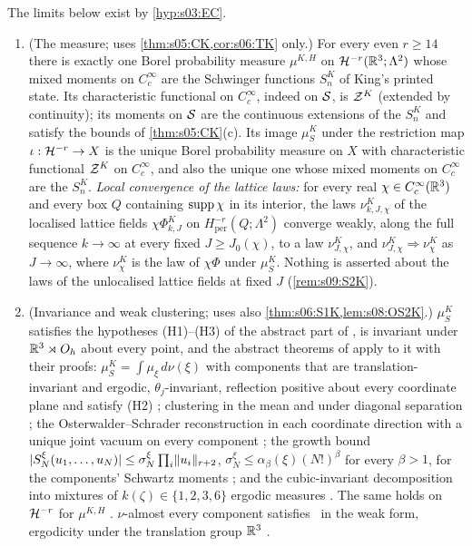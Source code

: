 \begin{theorem}\label{thm:s09:S2K}
The limits below exist by \cref{hyp:s03:EC}.
\begin{enumerate}[label=\textup{(\alph*)},leftmargin=*]
\item \textup{(The measure; uses \cref{thm:s05:CK,cor:s06:TK} only.)} For every even $r\ge14$ there is exactly one Borel probability measure $\mu^{K,H}$ on $\mathcal H^{-r}(\mathbb R^3;\Lambda^2)$ whose mixed moments on $C^\infty_c$ are the Schwinger functions $S^K_n$ of King's printed state. Its characteristic functional on $C^\infty_c$, indeed on $\mathcal S$, is $\mathcal Z^K$ (extended by continuity); its moments on $\mathcal S$ are the continuous extensions of the $S^K_n$ and satisfy the bounds of \cref{thm:s05:CK}(c). Its image $\mu^K_S$ under the restriction map $\iota:\mathcal H^{-r}\to X$ is the unique Borel probability measure on $X$ with characteristic functional $\mathcal Z^K$ on $C^\infty_c$, and also the unique one whose mixed moments on $C^\infty_c$ are the $S^K_n$. \emph{Local convergence of the lattice laws:} for every real $\chi\in C^\infty_c(\mathbb R^3)$ and every box $Q$ containing $\operatorname{supp}\chi$ in its interior, the laws $\nu^K_{k,J,\chi}$ of the localised lattice fields $\chi\Phi^K_{k,J}$ on $H^{-r}_{\mathrm{per}}(Q;\Lambda^2)$ converge weakly, along the full sequence $k\to\infty$ at every fixed $J\ge J_0(\chi)$, to a law $\nu^K_{J,\chi}$, and $\nu^K_{J,\chi}\Rightarrow\nu^K_\chi$ as $J\to\infty$, where $\nu^K_\chi$ is the law of $\chi\Phi$ under $\mu^K_S$. Nothing is asserted about the laws of the unlocalised lattice fields at fixed $J$ (\cref{rem:s09:S2K}).
\item \textup{(Invariance and weak clustering; uses also \cref{thm:s06:S1K,lem:s08:OS2K}.)} $\mu^K_S$ satisfies the hypotheses (H1)--(H3) of the abstract part of \cite{SymPhase}, is invariant under $\mathbb R^3\rtimes O_h$ about every point, and the abstract theorems of \cite{SymPhase} apply to it with their proofs: $\mu^K_S=\int\mu_\xi\,d\nu(\xi)$ with components that are translation-invariant and ergodic, $\theta_j$-invariant, reflection positive about every coordinate plane and satisfy (H2) \cite[Thm.~10.10]{SymPhase}; clustering in the mean \cite[Thm.~10.19]{SymPhase} and under diagonal separation \cite[Thm.~10.20]{SymPhase}; the Osterwalder--Schrader reconstruction in each coordinate direction with a unique joint vacuum on every component \cite[Prop.~10.16, Prop.~10.17(iii)]{SymPhase}; the growth bound $|S^\xi_N(u_1,\dots,u_N)|\le\sigma^\xi_N\prod_i\lVert u_i\rVert_{r+2}$, $\sigma^\xi_N\le\alpha_\beta(\xi)(N!)^\beta$ for every $\beta>1$, for the components' Schwartz moments \cite[Cor.~10.43(iv)]{SymPhase}; and the cubic-invariant decomposition into mixtures of $k(\zeta)\in\{1,2,3,6\}$ ergodic measures \cite[Thm.~10.12]{SymPhase}. The same holds on $\mathcal H^{-r}$ for $\mu^{K,H}$ \cite[Lemma~10.5(d)]{SymPhase}. $\nu$-almost every component satisfies \OSf\ in the weak form, ergodicity under the translation group $\mathbb R^3$ \cite[Def.~2.12(iii)]{SymPhase}.

\end{enumerate}
\end{theorem}
